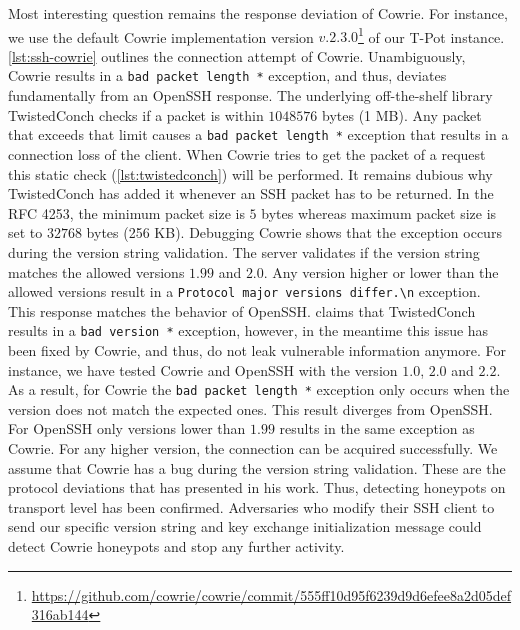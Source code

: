 \begin{figure}
    
\end{figure}

Most interesting question remains the response deviation of Cowrie.
For instance, we use the default Cowrie implementation version $v.2.3.0$\footnote{\url{https://github.com/cowrie/cowrie/commit/555ff10d95f6239d9d6efee8a2d05def316ab144}} of our T-Pot instance.
\autoref{lst:ssh-cowrie} outlines the connection attempt of Cowrie.
Unambiguously, Cowrie results in a  \verb|bad packet length *| exception, and thus, deviates fundamentally from an OpenSSH response.
The underlying off-the-shelf library TwistedConch checks if a packet is within $1048576$ bytes (1 MB).
Any packet that exceeds that limit causes a \verb|bad packet length *| exception that results in a connection loss of the client.
When Cowrie tries to get the packet of a request this static check (\autoref{lst:twistedconch}) will be performed.
It remains dubious why TwistedConch has added it whenever an SSH packet has to be returned.
In the RFC 4253, the minimum packet size is $5$ bytes whereas maximum packet size is set to $32768$ bytes (256 KB).
Debugging Cowrie shows that the exception occurs during the version string validation.
The server validates if the version string matches the allowed versions $1.99$ and $2.0$.
Any version higher or lower than the allowed versions result in a \verb|Protocol major versions differ.\n| exception.
This response matches the behavior of OpenSSH.
\citet{vetterl2020} claims that TwistedConch results in a \verb|bad version *| exception, however, in the meantime this issue has been fixed by Cowrie, and thus, do not leak vulnerable information anymore.
For instance, we have tested Cowrie and OpenSSH with the version $1.0$, $2.0$ and $2.2$. 
As a result, for Cowrie the \verb|bad packet length *| exception only occurs when the version does not match the expected ones.
This result diverges from OpenSSH.
For OpenSSH only versions lower than $1.99$ results in the same exception as Cowrie.
For any higher version, the connection can be acquired successfully.
We assume that Cowrie has a bug during the version string validation.
These are the protocol deviations that \citet{vetterl2020} has presented in his work.
Thus, detecting honeypots on transport level has been confirmed.
Adversaries who modify their SSH client to send our specific version string and key exchange initialization message could detect Cowrie honeypots and stop any further activity.

